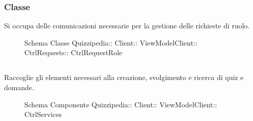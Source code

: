 \subsubsection{Classe }
Si occupa delle comunicazioni necessarie per la gestione delle richieste di ruolo.
\begin{figure}[H]
\centering
\noindent{}
\caption[Schema Classe CtrlRequestRole]{Schema Classe Quizzipedia:: Client:: ViewModelClient:: CtrlRequests:: CtrlRequestRole}
\end{figure}
\begin{itemize}
\end{itemize}
\subsection{}
Raccoglie gli elementi necessari alla creazione, svolgimento e ricerca di quiz e domande.
\begin{figure}[H]
\centering
\noindent{}
\caption[Schema Componente CtrlServices]{Schema Componente Quizzipedia:: Client:: ViewModelClient:: CtrlServices}
\end{figure}
